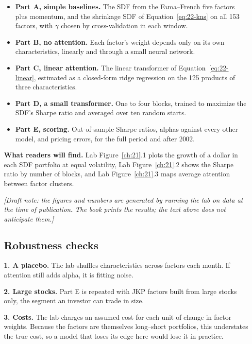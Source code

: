 \begin{itemize}
  \item \textbf{Part A, simple baselines.} The SDF from the Fama--French five factors plus momentum, and the shrinkage SDF of Equation~\eqref{eq:22-kns} on all 153 factors, with $\gamma$ chosen by cross-validation in each window.
  \item \textbf{Part B, no attention.} Each factor's weight depends only on its own characteristics, linearly and through a small neural network.
  \item \textbf{Part C, linear attention.} The linear transformer of Equation~\eqref{eq:22-linear}, estimated as a closed-form ridge regression on the 125 products of three characteristics.
  \item \textbf{Part D, a small transformer.} One to four blocks, trained to maximize the SDF's Sharpe ratio and averaged over ten random starts.
  \item \textbf{Part E, scoring.} Out-of-sample Sharpe ratios, alphas against every other model, and pricing errors, for the full period and after 2002.
\end{itemize}

\textbf{What readers will find.} Lab Figure~\ref{ch:21}.1 plots the growth of a dollar in each SDF portfolio at equal volatility, Lab Figure~\ref{ch:21}.2 shows the Sharpe ratio by number of blocks, and Lab Figure~\ref{ch:21}.3 maps average attention between factor clusters.

\emph{[Draft note: the figures and numbers are generated by running the lab on data at the time of publication. The book prints the results; the text above does not anticipate them.]}

\subsection{Robustness checks}
\label{sec:22-stress}

\textbf{1. A placebo.} The lab shuffles characteristics across factors each month. If attention still adds alpha, it is fitting noise.

\textbf{2. Large stocks.} Part E is repeated with JKP factors built from large stocks only, the segment an investor can trade in size.

\textbf{3. Costs.} The lab charges an assumed cost for each unit of change in factor weights. Because the factors are themselves long--short portfolios, this understates the true cost, so a model that loses its edge here would lose it in practice.

